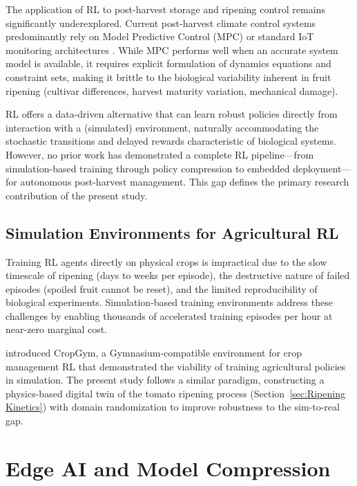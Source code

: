     The application of RL to post-harvest storage and ripening control remains significantly underexplored. Current post-harvest climate control systems predominantly rely on Model Predictive Control (MPC) or standard IoT monitoring architectures \citep{li2021edgeai}. While MPC performs well when an accurate system model is available, it requires explicit formulation of dynamics equations and constraint sets, making it brittle to the biological variability inherent in fruit ripening (cultivar differences, harvest maturity variation, mechanical damage).

    RL offers a data-driven alternative that can learn robust policies directly from interaction with a (simulated) environment, naturally accommodating the stochastic transitions and delayed rewards characteristic of biological systems. However, no prior work has demonstrated a complete RL pipeline---from simulation-based training through policy compression to embedded deployment---for autonomous post-harvest management. This gap defines the primary research contribution of the present study.

    \subsection{Simulation Environments for Agricultural RL}

    Training RL agents directly on physical crops is impractical due to the slow timescale of ripening (days to weeks per episode), the destructive nature of failed episodes (spoiled fruit cannot be reset), and the limited reproducibility of biological experiments. Simulation-based training environments address these challenges by enabling thousands of accelerated training episodes per hour at near-zero marginal cost.

    \citet{overweg2021cropgym} introduced CropGym, a Gymnasium-compatible environment for crop management RL that demonstrated the viability of training agricultural policies in simulation. The present study follows a similar paradigm, constructing a physics-based digital twin of the tomato ripening process (Section~\ref{sec:Ripening Kinetics}) with domain randomization to improve robustness to the sim-to-real gap.



\section{Edge AI and Model Compression}
    \label{sec:Edge AI}

